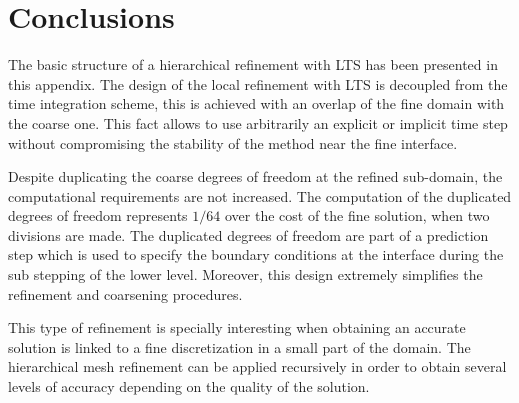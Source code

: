 \section{Conclusions}


The basic structure of a hierarchical refinement with LTS has been presented in this appendix. The design of the local refinement with LTS is decoupled from the time integration scheme, this is achieved with an overlap of the fine domain with the coarse one. This fact allows to use arbitrarily an explicit or implicit time step without compromising the stability of the method near the fine interface.

Despite duplicating the coarse degrees of freedom at the refined sub-domain, the computational requirements are not increased. The computation of the duplicated degrees of freedom represents $1/64$ over the cost of the fine solution, when two divisions are made. The duplicated degrees of freedom are part of a prediction step which is used to specify the boundary conditions at the interface during the sub stepping of the lower level. Moreover, this design extremely simplifies the refinement and coarsening procedures.

This type of refinement is specially interesting when obtaining an accurate solution is linked to a fine discretization in a small part of the domain. The hierarchical mesh refinement can be applied recursively in order to obtain several levels of accuracy depending on the quality of the solution.


